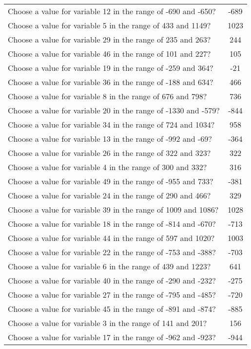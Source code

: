 \documentclass[10pt,a4paper]{article}
\begin{document}
\begin{appendix}
\begin{tabular}{ l  c }
\\Choose a value for variable 12 in the range of -690 and -650? & -689
\\Choose a value for variable 5 in the range of 433 and 1149? & 1023
\\Choose a value for variable 29 in the range of 235 and 263? & 244
\\Choose a value for variable 46 in the range of 101 and 227? & 105
\\Choose a value for variable 19 in the range of -259 and 364? & -21
\\Choose a value for variable 36 in the range of -188 and 634? & 466
\\Choose a value for variable 8 in the range of 676 and 798? & 736
\\Choose a value for variable 20 in the range of -1330 and -579? & -844
\\Choose a value for variable 34 in the range of 724 and 1034? & 958
\\Choose a value for variable 13 in the range of -992 and -69? & -364
\\Choose a value for variable 26 in the range of 322 and 323? & 322
\\Choose a value for variable 4 in the range of 300 and 332? & 316
\\Choose a value for variable 49 in the range of -955 and 733? & -381
\\Choose a value for variable 24 in the range of 290 and 466? & 329
\\Choose a value for variable 39 in the range of 1009 and 1086? & 1028
\\Choose a value for variable 18 in the range of -814 and -670? & -713
\\Choose a value for variable 44 in the range of 597 and 1020? & 1003
\\Choose a value for variable 22 in the range of -753 and -388? & -703
\\Choose a value for variable 6 in the range of 439 and 1223? & 641
\\Choose a value for variable 40 in the range of -290 and -232? & -275
\\Choose a value for variable 27 in the range of -795 and -485? & -720
\\Choose a value for variable 45 in the range of -891 and -874? & -885
\\Choose a value for variable 3 in the range of 141 and 201? & 156
\\Choose a value for variable 17 in the range of -962 and -923? & -944

\end{tabular}
\end{appendix}
\end{document}
